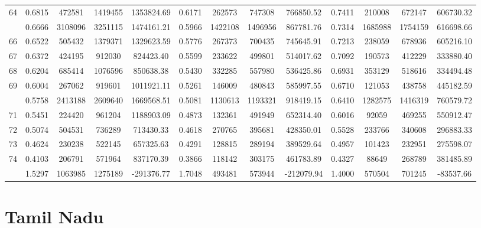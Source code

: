 \documentclass[
  12pt,
]{article}
\begin{document}
\begin{longtable}[t]{lcccccccccccc}
64 & 0.6815 & 472581 & 1419455 & 1353824.69 & 0.6171 & 262573 & 747308 & 766850.52 & 0.7411 & 210008 & 672147 & 606730.32\\
\addlinespace
65 & 0.6666 & 3108096 & 3251115 & 1474161.21 & 0.5966 & 1422108 & 1496956 & 867781.76 & 0.7314 & 1685988 & 1754159 & 616698.66\\
66 & 0.6522 & 505432 & 1379371 & 1329623.59 & 0.5776 & 267373 & 700435 & 745645.91 & 0.7213 & 238059 & 678936 & 605216.10\\
67 & 0.6372 & 424195 & 912030 & 824423.40 & 0.5599 & 233622 & 499801 & 514017.62 & 0.7092 & 190573 & 412229 & 333880.40\\
68 & 0.6204 & 685414 & 1076596 & 850638.38 & 0.5430 & 332285 & 557980 & 536425.86 & 0.6931 & 353129 & 518616 & 334494.48\\
69 & 0.6004 & 267062 & 919601 & 1011921.11 & 0.5261 & 146009 & 480843 & 585997.55 & 0.6710 & 121053 & 438758 & 445182.59\\
\addlinespace
70 & 0.5758 & 2413188 & 2609640 & 1669568.51 & 0.5081 & 1130613 & 1193321 & 918419.15 & 0.6410 & 1282575 & 1416319 & 760579.72\\
71 & 0.5451 & 224420 & 961204 & 1188903.09 & 0.4873 & 132361 & 491949 & 652314.40 & 0.6016 & 92059 & 469255 & 550912.47\\
72 & 0.5074 & 504531 & 736289 & 713430.33 & 0.4618 & 270765 & 395681 & 428350.01 & 0.5528 & 233766 & 340608 & 296883.33\\
73 & 0.4624 & 230238 & 522145 & 657325.63 & 0.4291 & 128815 & 289194 & 389529.64 & 0.4957 & 101423 & 232951 & 275598.07\\
74 & 0.4103 & 206791 & 571964 & 837170.39 & 0.3866 & 118142 & 303175 & 461783.89 & 0.4327 & 88649 & 268789 & 381485.89\\
\addlinespace
75 & 1.5297 & 1063985 & 1275189 & -291376.77 & 1.7048 & 493481 & 573944 & -212079.94 & 1.4000 & 570504 & 701245 & -83537.66\\*
\end{longtable}
\endgroup{}

\pagebreak

\hypertarget{tamil-nadu}{%
\section{Tamil Nadu}\label{tamil-nadu}}

\begingroup\fontsize{9.7}{11.7}\selectfont
\end{document}
